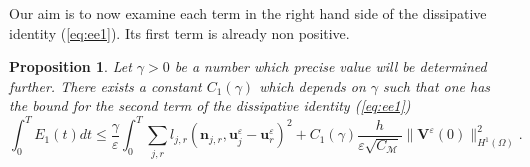 \documentclass[a4paper,french,english,10pt]{article}
\newcommand\eps{\varepsilon}
\newtheorem{pro}[theorem]{Proposition}
\begin{document}
Our aim is to now examine each term in the right hand side of the dissipative identity
(\ref{eq:ee1}). Its  first term is already non positive.
\begin{pro}
Let $\gamma>0$ be a number which precise value will be determined further.
There exists a constant $C_1(\gamma)$ which depends on $\gamma$ such that 
one has
the bound for the second term of the dissipative identity (\ref{eq:ee1})
\begin{equation} \label{eq:bound1}
\int_0^T E_1(t)dt \leq 
\frac{\gamma}{\eps}\int_0^T\sum_{j,r}l_{j,r}(\textbf{n}_{j,r},\textbf{u}_j^{\eps}-\textbf{u}
_r^{\eps})^2 +
C_1(\gamma) \frac h { \varepsilon \sqrt{C_\mathcal M} }  \| \mathbf{V}^{\eps}(0) \|_{H^1(\Omega)}^2.
\end{equation}
\end{pro}
\end{document}
